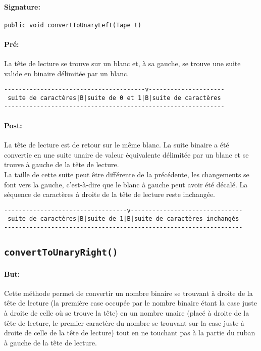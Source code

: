 \documentclass[a4paper,11pt]{article}
\begin{document}
\paragraph{Signature:} \texttt{public void convertToUnaryLeft(Tape t)}
\paragraph{Pré:} La tête de lecture se trouve sur un blanc et, à sa gauche, se trouve une suite valide en binaire délimitée par un blanc.
\begin{verbatim}
---------------------------------------v---------------------
 suite de caractères|B|suite de 0 et 1|B|suite de caractères
-------------------------------------------------------------
\end{verbatim}
\paragraph{Post:} La tête de lecture est de retour sur le même blanc. La suite binaire a été convertie en une suite unaire de valeur équivalente délimitée par un blanc et se trouve à gauche de la tête de lecture.\\
La taille de cette suite peut être différente de la précédente, les changements se font vers la gauche, c'est-à-dire que le blanc à gauche peut avoir été décalé. La séquence de caractères à droite de la tête de lecture reste inchangée.
\begin{verbatim}
----------------------------------v-------------------------------
 suite de caractères|B|suite de 1|B|suite de caractères inchangés
------------------------------------------------------------------
\end{verbatim}
\subsection{\texttt{convertToUnaryRight()}}
\paragraph{But:} Cette méthode permet de convertir un nombre binaire se trouvant à droite de la tête de lecture (la première case occupée par le nombre binaire étant la case juste à droite de celle où se trouve la tête) en un nombre unaire (placé à droite de la tête de lecture, le premier caractère du nombre se trouvant sur la case juste à droite de celle de la tête de lecture) tout en ne touchant pas à la partie du ruban à gauche de la tête de lecture.
\end{document}
